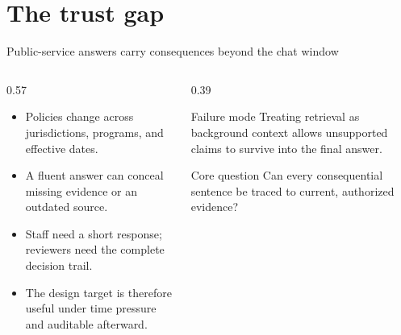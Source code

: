 \section{The trust gap}

\begin{frame}{Public-service answers carry consequences beyond the chat window}
  \begin{columns}[T,onlytextwidth]
    \begin{column}{0.57\textwidth}
      \begin{itemize}[<+->]
        \item Policies change across jurisdictions, programs, and effective dates.
        \item A fluent answer can conceal missing evidence or an outdated source.
        \item Staff need a short response; reviewers need the complete decision trail.
        \item The design target is therefore \alert{useful under time pressure and auditable afterward}.
      \end{itemize}
    \end{column}
    \begin{column}{0.39\textwidth}
      \begin{alertblock}{Failure mode}
        Treating retrieval as background context allows unsupported claims to survive into the final answer.
      \end{alertblock}
      \vspace{0.18cm}
      \begin{exampleblock}{Core question}
        Can every consequential sentence be traced to current, authorized evidence?
      \end{exampleblock}
    \end{column}
  \end{columns}
\end{frame}

